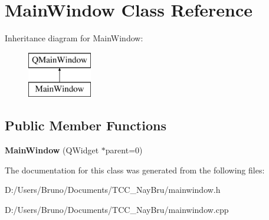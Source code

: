 \section{Main\+Window Class Reference}
\label{class_main_window}
Inheritance diagram for Main\+Window\+:\begin{figure}[H]
\begin{center}
\leavevmode
\includegraphics[height=2.000000cm]{class_main_window}
\end{center}
\end{figure}
\subsection*{Public Member Functions}
\begin{DoxyCompactItemize}
\item 
{\bfseries Main\+Window} (Q\+Widget $\ast$parent=0)\label{class_main_window_a8b244be8b7b7db1b08de2a2acb9409db}

\end{DoxyCompactItemize}


The documentation for this class was generated from the following files\+:\begin{DoxyCompactItemize}
\item 
D\+:/\+Users/\+Bruno/\+Documents/\+T\+C\+C\+\_\+\+Nay\+Bru/mainwindow.\+h\item 
D\+:/\+Users/\+Bruno/\+Documents/\+T\+C\+C\+\_\+\+Nay\+Bru/mainwindow.\+cpp\end{DoxyCompactItemize}
